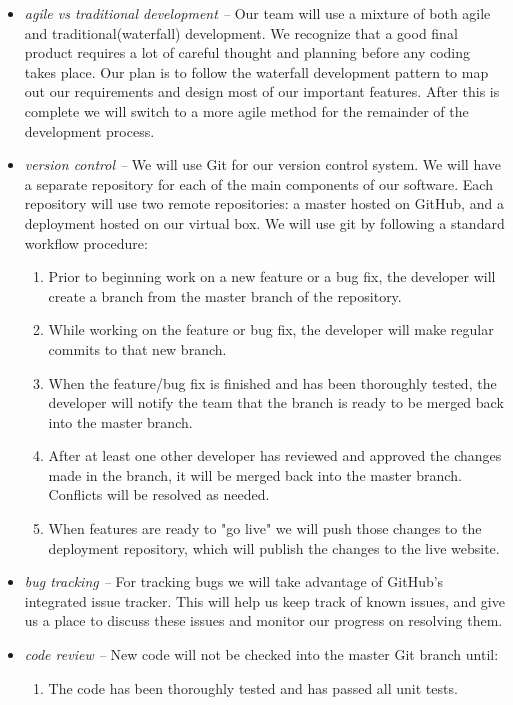 \documentclass{extarticle}
\begin{document}
\begin{itemize}
\item \emph{agile vs traditional development -- } Our team will use a mixture of both agile and traditional(waterfall)
development. We recognize that a good final product requires a lot of careful thought and planning before any coding
takes place. Our plan is to follow the waterfall development pattern to map out our requirements and design most of
our important features. After this is complete we will switch to a more agile method for the remainder of the
development process.
\item \emph{version control -- }We will use Git for our version control system.  We will have a separate repository
for each of the main components of our software.  Each repository will use two remote repositories: a master hosted
on GitHub, and a deployment hosted on our virtual box.  We will use git by following a standard workflow procedure:
\begin{enumerate}
\item Prior to beginning work on a new feature or a bug fix, the developer will create a branch from the master
branch of the repository.
\item While working on the feature or bug fix, the developer will make regular commits to that new branch.
\item When the feature/bug fix is finished and has been thoroughly tested, the developer will notify the team that
the branch is ready to be merged back into the master branch.
\item After at least one other developer has reviewed and approved the changes made in the branch, it will be
merged back into the master branch.  Conflicts will be resolved as needed.
\item When features are ready to "go live" we will push those changes to the deployment repository, which will
publish the changes to the live website.
\end{enumerate}
\item \emph{bug tracking -- }For tracking bugs we will take advantage of GitHub's integrated issue tracker.  This
will help us keep track of known issues, and give us a place to discuss these issues and monitor our progress on
resolving them.
\item \emph{code review -- } New code will not be checked into the master Git branch until:
\begin{enumerate}
    \item The code has been thoroughly tested and has passed all unit tests.

\end{enumerate}
\end{itemize}
\end{document}
